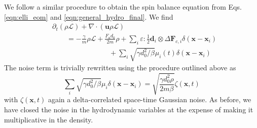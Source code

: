 \documentclass[%
 reprint,
superscriptaddress,
longbibliography,
 amsmath,amssymb,
 prl,
 citeautoscript,
]{revtex4-1}
\begin{document}
We follow a similar procedure to obtain the spin balance equation from Eqs. \ref{eqn:elli_eom} and \ref{eqn:general_hydro_final}. We find
\begin{equation}
\begin{split}
&\partial_t \left( \rho \mathcal{L} \right) + \nabla \cdot \left( {\boldsymbol u} \rho \mathcal{L} \right) \\
&\quad \quad= - \frac{\gamma}{m} \rho \mathcal{L} + \frac{F_a d_0}{2m} \rho + \sum_i \varepsilon : \frac{1}{2} {\boldsymbol d}_i \otimes \Delta {\boldsymbol F}_{c,i} \delta \left( {\boldsymbol x} - {\boldsymbol x}_i \right) \\
&\quad \quad \quad \quad \quad \quad \quad \quad + \sum_i \sqrt{\gamma d_0^2 / \beta} \mu_i(t) \delta \left( {\boldsymbol x} - {\boldsymbol x}_i \right)
\end{split}
\label{eqn:spin_initial}
\end{equation}
The noise term is trivially rewritten using the procedure outlined above as
\begin{equation}
\sum_i \sqrt{\gamma d_0^2 / \beta} \mu_i \delta \left( {\boldsymbol x} - {\boldsymbol x}_i \right) = \sqrt{\frac{\gamma d_0^2 \rho}{2 m \beta}} \zeta \left( {\boldsymbol x}, t \right)
\label{eqn:noise_spin}
\end{equation}
with $\zeta \left( {\boldsymbol x}, t \right)$ again a delta-correlated space-time Gaussian noise. As before, we have closed the noise in the hydrodynamic variables at the expense of making it multiplicative in the density.
\end{document}
